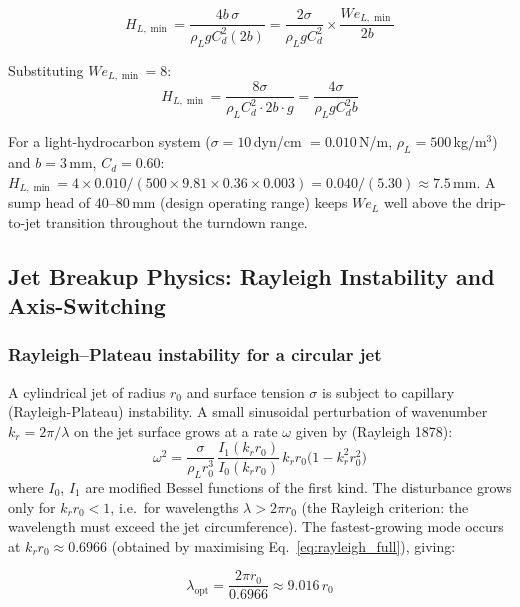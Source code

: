 \documentclass[11pt,letterpaper]{article}
\newcommand{\rhoL}{\rho_L}
\newcommand{\We}{\mathit{We}}
\begin{document}
\begin{equation}
  H_{L,\min} = \frac{4 b\,\sigma}{\rhoL g C_d^2 (2b)}
             = \frac{2\sigma}{\rhoL g C_d^2}
             \times \frac{\We_{L,\min}}{2b}
  \label{eq:hmin}
\end{equation}

Substituting $\We_{L,\min} = 8$:
\begin{equation}
  H_{L,\min} = \frac{8\sigma}{\rhoL C_d^2 \cdot 2b \cdot g}
             = \frac{4\sigma}{\rhoL g C_d^2 b}
  \label{eq:hmin2}
\end{equation}

For a light-hydrocarbon system ($\sigma = 10$\,dyn/cm $= 0.010$\,N/m,
$\rhoL = 500$\,kg/m$^3$) and $b = 3$\,mm, $C_d = 0.60$:
$H_{L,\min} = 4 \times 0.010 / (500 \times 9.81 \times 0.36 \times 0.003)
= 0.040/(5.30) \approx 7.5$\,mm.
A sump head of 40--80\,mm (design operating range) keeps $\We_L$ well above
the drip-to-jet transition throughout the turndown range.

\subsection{Jet Breakup Physics: Rayleigh Instability and Axis-Switching}
\label{sec:breakup}

\subsubsection{Rayleigh--Plateau instability for a circular jet}
\label{sec:rayleigh}

A cylindrical jet of radius $r_0$ and surface tension $\sigma$ is subject to
capillary (Rayleigh-Plateau) instability.  A small sinusoidal perturbation of
wavenumber $k_r = 2\pi/\lambda$ on the jet surface grows at a rate $\omega$
given by (Rayleigh 1878):
\begin{equation}
  \omega^2 = \frac{\sigma}{\rhoL r_0^3}\,
             \frac{I_1(k_r r_0)}{I_0(k_r r_0)}\,
             k_r r_0 \bigl(1 - k_r^2 r_0^2\bigr)
  \label{eq:rayleigh_full}
\end{equation}
where $I_0$, $I_1$ are modified Bessel functions of the first kind.  The
disturbance grows only for $k_r r_0 < 1$, i.e.\ for wavelengths $\lambda
> 2\pi r_0$ (the Rayleigh criterion: the wavelength must exceed the jet
circumference).  The fastest-growing mode occurs at $k_r r_0 \approx
0.6966$ (obtained by maximising Eq.~\ref{eq:rayleigh_full}), giving:

\begin{equation}
  \lambda_{\mathrm{opt}} = \frac{2\pi r_0}{0.6966} \approx 9.016\,r_0
  \label{eq:lambda_opt}
\end{equation}
\end{document}
